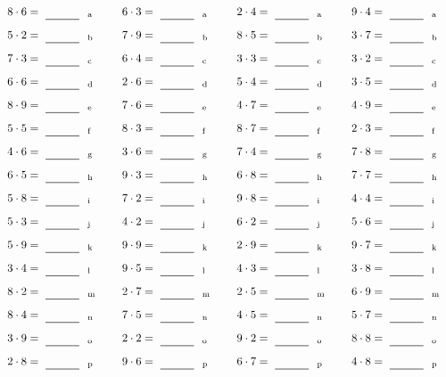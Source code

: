 \documentclass
[
  draft    = true,
  fontsize = 11pt,
  parskip  = half-
]
{scrartcl}
\begin{document}
\par\vfill\par
\begin{align*}
    \pline{8\cdot6}&=\rline{a}
  & \pline{6\cdot3}&=\rline{a}
  & \pline{2\cdot4}&=\rline{a}
  & \pline{9\cdot4}&=\rline{a} \\[1ex]
    \pline{5\cdot2}&=\rline{b}
  & \pline{7\cdot9}&=\rline{b}
  & \pline{8\cdot5}&=\rline{b}
  & \pline{3\cdot7}&=\rline{b} \\[1ex]
    \pline{7\cdot3}&=\rline{c}
  & \pline{6\cdot4}&=\rline{c}
  & \pline{3\cdot3}&=\rline{c}
  & \pline{3\cdot2}&=\rline{c} \\[1ex]
    \pline{6\cdot6}&=\rline{d}
  & \pline{2\cdot6}&=\rline{d}
  & \pline{5\cdot4}&=\rline{d}
  & \pline{3\cdot5}&=\rline{d} \\[1ex]
    \pline{8\cdot9}&=\rline{e}
  & \pline{7\cdot6}&=\rline{e}
  & \pline{4\cdot7}&=\rline{e}
  & \pline{4\cdot9}&=\rline{e} \\[1ex]
    \pline{5\cdot5}&=\rline{f}
  & \pline{8\cdot3}&=\rline{f}
  & \pline{8\cdot7}&=\rline{f}
  & \pline{2\cdot3}&=\rline{f} \\[1ex]
    \pline{4\cdot6}&=\rline{g}
  & \pline{3\cdot6}&=\rline{g}
  & \pline{7\cdot4}&=\rline{g}
  & \pline{7\cdot8}&=\rline{g} \\[1ex]
    \pline{6\cdot5}&=\rline{h}
  & \pline{9\cdot3}&=\rline{h}
  & \pline{6\cdot8}&=\rline{h}
  & \pline{7\cdot7}&=\rline{h} \\[1ex]
    \pline{5\cdot8}&=\rline{i}
  & \pline{7\cdot2}&=\rline{i}
  & \pline{9\cdot8}&=\rline{i}
  & \pline{4\cdot4}&=\rline{i} \\[1ex]
    \pline{5\cdot3}&=\rline{j}
  & \pline{4\cdot2}&=\rline{j}
  & \pline{6\cdot2}&=\rline{j}
  & \pline{5\cdot6}&=\rline{j} \\[1ex]
    \pline{5\cdot9}&=\rline{k}
  & \pline{9\cdot9}&=\rline{k}
  & \pline{2\cdot9}&=\rline{k}
  & \pline{9\cdot7}&=\rline{k} \\[1ex]
    \pline{3\cdot4}&=\rline{l}
  & \pline{9\cdot5}&=\rline{l}
  & \pline{4\cdot3}&=\rline{l}
  & \pline{3\cdot8}&=\rline{l} \\[1ex]
    \pline{8\cdot2}&=\rline{m}
  & \pline{2\cdot7}&=\rline{m}
  & \pline{2\cdot5}&=\rline{m}
  & \pline{6\cdot9}&=\rline{m} \\[1ex]
    \pline{8\cdot4}&=\rline{n}
  & \pline{7\cdot5}&=\rline{n}
  & \pline{4\cdot5}&=\rline{n}
  & \pline{5\cdot7}&=\rline{n} \\[1ex]
    \pline{3\cdot9}&=\rline{o}
  & \pline{2\cdot2}&=\rline{o}
  & \pline{9\cdot2}&=\rline{o}
  & \pline{8\cdot8}&=\rline{o} \\[1ex]
    \pline{2\cdot8}&=\rline{p}
  & \pline{9\cdot6}&=\rline{p}
  & \pline{6\cdot7}&=\rline{p}
  & \pline{4\cdot8}&=\rline{p}
\end{align*}
\end{document}
